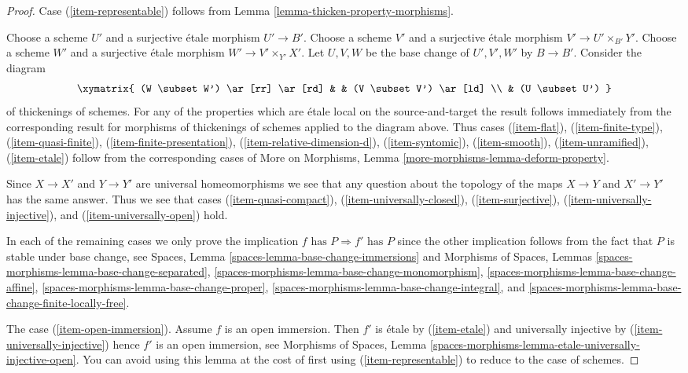 \begin{proof}
Case (\ref{item-representable}) follows from
Lemma \ref{lemma-thicken-property-morphisms}.

\medskip\noindent
Choose a scheme $U'$ and a surjective \'etale morphism $U' \to B'$.
Choose a scheme $V'$ and a surjective \'etale morphism
$V' \to U' \times_{B'} Y'$.
Choose a scheme $W'$ and a surjective \'etale morphism
$W' \to V' \times_{Y'} X'$. Let $U, V, W$ be the base change
of $U', V', W'$ by $B \to B'$. Consider the diagram
$$
\xymatrix{
(W \subset W') \ar[rr] \ar[rd] & & (V \subset V') \ar[ld] \\
& (U \subset U')
}
$$
of thickenings of schemes. For any of the properties which are
\'etale local on the source-and-target the result follows immediately
from the corresponding result for morphisms of thickenings of schemes
applied to the diagram above. Thus cases
(\ref{item-flat}), (\ref{item-finite-type}),
(\ref{item-quasi-finite}), (\ref{item-finite-presentation}),
(\ref{item-relative-dimension-d}), (\ref{item-syntomic}),
(\ref{item-smooth}), (\ref{item-unramified}), (\ref{item-etale})
follow from the corresponding cases of
More on Morphisms, Lemma \ref{more-morphisms-lemma-deform-property}.

\medskip\noindent
Since $X \to X'$ and $Y \to Y'$ are universal homeomorphisms
we see that any question about the topology of the maps
$X \to Y$ and $X' \to Y'$ has the same answer. Thus we see
that cases (\ref{item-quasi-compact}), (\ref{item-universally-closed}),
(\ref{item-surjective}), (\ref{item-universally-injective}), and
(\ref{item-universally-open}) hold.

\medskip\noindent
In each of the remaining cases we only prove the implication
$f\text{ has }P \Rightarrow f'\text{ has }P$ since the other
implication follows from the fact that $P$ is stable under
base change, see
Spaces, Lemma \ref{spaces-lemma-base-change-immersions} and
Morphisms of Spaces, Lemmas
\ref{spaces-morphisms-lemma-base-change-separated},
\ref{spaces-morphisms-lemma-base-change-monomorphism},
\ref{spaces-morphisms-lemma-base-change-affine},
\ref{spaces-morphisms-lemma-base-change-proper},
\ref{spaces-morphisms-lemma-base-change-integral}, and
\ref{spaces-morphisms-lemma-base-change-finite-locally-free}.

\medskip\noindent
The case (\ref{item-open-immersion}). Assume $f$ is an open immersion.
Then $f'$ is \'etale by (\ref{item-etale}) and universally injective
by (\ref{item-universally-injective})
hence $f'$ is an open immersion, see
Morphisms of Spaces, Lemma
\ref{spaces-morphisms-lemma-etale-universally-injective-open}.
You can avoid using this lemma at the cost of first
using (\ref{item-representable}) to reduce to the case of schemes.


\end{proof}
